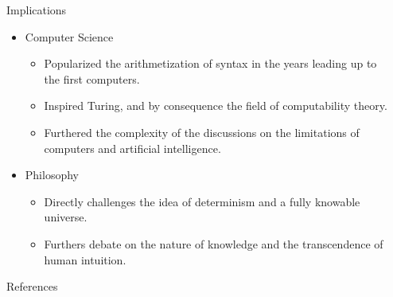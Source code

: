 \documentclass[final]{beamer}
\newlength{\sepwidth}
\newlength{\colwidth}
\newcommand{\separatorcolumn}{\begin{column}{\sepwidth}\end{column}}
\begin{document}
\begin{frame}[t]
\begin{columns}[t]
\begin{column}{\colwidth}
\begin{block}{Implications}
\begin{itemize}
      \item Computer Science
        \begin{itemize}

            \item Popularized the arithmetization of syntax in the years leading up to the first computers.
            \item Inspired Turing, and by consequence the field of computability theory.
            \item Furthered the complexity of the discussions on the limitations of computers and artificial intelligence.
            
        \end{itemize}
      
      \item Philosophy
        \begin{itemize}
            \item Directly challenges the idea of determinism and a fully knowable universe.
            \item Furthers debate on the nature of knowledge and the transcendence of human intuition.
        \end{itemize}
        
    \end{itemize}
    
\end{block}

  \begin{block}{References}
    \nocite{*}
    \footnotesize{}

  \end{block}

\end{column}

\separatorcolumn
\end{columns}
\end{frame}
\end{document}

